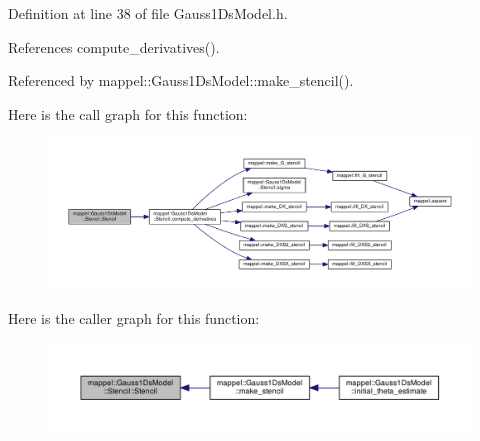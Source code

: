 Definition at line 38 of file Gauss1\+Ds\+Model.\+h.



References compute\+\_\+derivatives().



Referenced by mappel\+::\+Gauss1\+Ds\+Model\+::make\+\_\+stencil().



Here is the call graph for this function\+:\nopagebreak
\begin{figure}[H]
\begin{center}
\leavevmode
\includegraphics[width=350pt]{classmappel_1_1Gauss1DsModel_1_1Stencil_a7d151d646b8286c83a3c6e5b49b1a66d_cgraph}
\end{center}
\end{figure}




Here is the caller graph for this function\+:\nopagebreak
\begin{figure}[H]
\begin{center}
\leavevmode
\includegraphics[width=350pt]{classmappel_1_1Gauss1DsModel_1_1Stencil_a7d151d646b8286c83a3c6e5b49b1a66d_icgraph}
\end{center}
\end{figure}


